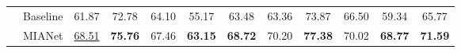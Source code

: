 \documentclass[10pt,twocolumn,letterpaper]{article}
\begin{document}
\begin{table*}[htbp]
\begin{tabular}{c|ccccccccccc}
		& \multicolumn{1}{c|}{Baseline}                                          & 61.87                                  & 72.78                                  & 64.10                                  & 55.17                                  & \multicolumn{1}{c|}{63.48}                                                       & 63.36                         & 73.87                                  & 66.50                         & 59.34                                  & 65.77                         \\
		& \multicolumn{1}{c|}{\cellcolor[HTML]{EFEFEF}MIANet}                     & \cellcolor[HTML]{EFEFEF}\underline{68.51}          & \cellcolor[HTML]{EFEFEF}\textbf{75.76} & \cellcolor[HTML]{EFEFEF}67.46          & \cellcolor[HTML]{EFEFEF}\textbf{63.15} & \multicolumn{1}{c|}{\cellcolor[HTML]{EFEFEF}\textbf{68.72}}                      & \cellcolor[HTML]{EFEFEF}70.20 & \cellcolor[HTML]{EFEFEF}\textbf{77.38} & \cellcolor[HTML]{EFEFEF}70.02 & \cellcolor[HTML]{EFEFEF}\textbf{68.77}          & \cellcolor[HTML]{EFEFEF}\textbf{71.59} \\ \hline
	\end{tabular}
	\label{table1}
\end{table*} 
\end{document}
